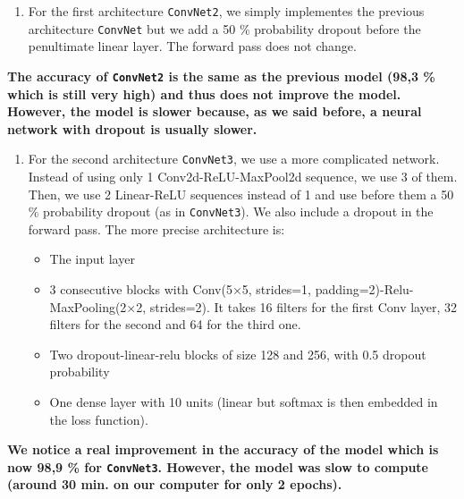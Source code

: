 \documentclass[10pt,a4paper]{article}
\providecommand{\tightlist}{%
  \setlength{\parskip}{0pt}
  }
\theoremstyle{break}
\begin{document}
\begin{enumerate}
\def\labelenumi{\arabic{enumi}.}
\tightlist
\item
  For the first architecture \texttt{ConvNet2}, we simply implementes the previous architecture \texttt{ConvNet} but we add a 50 \% probability dropout before the penultimate linear layer. The forward pass does not change.
\end{enumerate}

\textbf{\faArrowCircleRight{} The accuracy of \texttt{ConvNet2} is the same as the previous model (98,3 \% which is still very high) and thus does not improve the model. However, the model is slower because, as we said before, a neural network with dropout is usually slower.}

\begin{enumerate}
\def\labelenumi{\arabic{enumi}.}
\setcounter{enumi}{1}
\tightlist
\item
  For the second architecture \texttt{ConvNet3}, we use a more complicated network. Instead of using only 1 Conv2d-ReLU-MaxPool2d sequence, we use 3 of them. Then, we use 2 Linear-ReLU sequences instead of 1 and use before them a 50 \% probability dropout (as in \texttt{ConvNet3}). We also include a dropout in the forward pass. The more precise architecture is:

  \begin{itemize}
  \tightlist
  \item
    The input layer
  \item
    3 consecutive blocks with Conv(5×5, strides=1, padding=2)-Relu-MaxPooling(2×2, strides=2). It takes 16 filters for the first Conv layer, 32 filters for the second and 64 for the third one.
  \item
    Two dropout-linear-relu blocks of size 128 and 256, with 0.5 dropout probability
  \item
    One dense layer with 10 units (linear but softmax is then embedded in the loss function).
  \end{itemize}
\end{enumerate}

\textbf{\faArrowCircleRight{} We notice a real improvement in the accuracy of the model which is now 98,9 \% for \texttt{ConvNet3}. However, the model was slow to compute (around 30 min. on our computer for only 2 epochs).}
\end{document}
